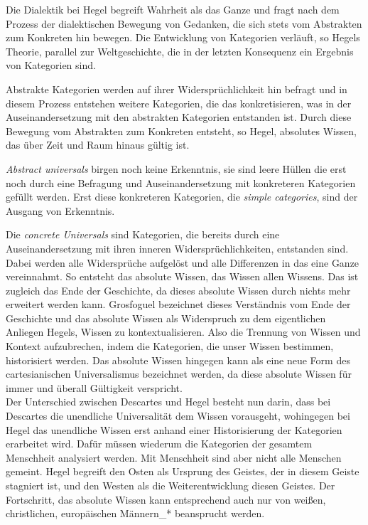 Die Dialektik bei Hegel begreift Wahrheit als das Ganze und fragt nach dem
Prozess der dialektischen Bewegung von Gedanken, die sich stets vom Abstrakten
zum Konkreten hin bewegen. Die Entwicklung von Kategorien verläuft, so Hegels
Theorie, parallel zur Weltgeschichte, die in der letzten Konsequenz ein
Ergebnis von Kategorien sind.\footnotemark {}

Abstrakte Kategorien werden auf ihrer Widersprüchlichkeit hin befragt und in
diesem Prozess entstehen weitere Kategorien, die das konkretisieren, was in der
Auseinandersetzung mit den abstrakten Kategorien entstanden ist. Durch diese
Bewegung vom Abstrakten zum Konkreten entsteht, so Hegel, absolutes Wissen, das
über Zeit und Raum hinaus gültig ist.

\textit{Abstract universals} birgen noch keine
Erkenntnis, sie sind leere Hüllen die erst noch durch eine Befragung und
Auseinandersetzung mit konkreteren Kategorien gefüllt werden. Erst diese
konkreteren Kategorien, die \textit{simple categories}, sind der Ausgang von
Erkenntnis. \footnotemark {}

Die \textit{concrete Universals} sind Kategorien, die bereits durch eine
Auseinandersetzung mit ihren inneren Widersprüchlichkeiten, entstanden
sind.\footnotemark {} Dabei werden alle Widersprüche aufgelöst und alle Differenzen in das eine
Ganze vereinnahmt. So entsteht das absolute Wissen, das Wissen allen
Wissens.\footnotemark {} Das ist zugleich das Ende der Geschichte, da dieses absolute Wissen
durch nichts mehr erweitert werden kann. Grosfoguel bezeichnet dieses
Verständnis vom Ende der Geschichte und das absolute Wissen als Widerspruch zu
dem eigentlichen Anliegen Hegels, Wissen zu kontextualisieren. Also die
Trennung von Wissen und Kontext aufzubrechen, indem die Kategorien, die unser
Wissen bestimmen, historisiert werden. Das absolute Wissen hingegen kann als
eine neue Form des cartesianischen Universalismus bezeichnet werden, da diese
absolute Wissen für immer und überall Gültigkeit verspricht.
\\

Der Unterschied zwischen Descartes und Hegel besteht nun darin, dass bei
Descartes die unendliche Universalität dem Wissen vorausgeht, wohingegen bei
Hegel das unendliche Wissen erst anhand einer Historisierung der Kategorien
erarbeitet wird. Dafür müssen wiederum die Kategorien der gesamtem Menschheit
analysiert werden.  Mit Menschheit sind aber nicht alle Menschen gemeint. Hegel
begreift den Osten als Ursprung des Geistes, der in diesem Geiste stagniert
ist, und den Westen als die Weiterentwicklung diesen Geistes. Der Fortschritt,
das absolute Wissen kann entsprechend auch nur von weißen, christlichen,
europäischen Männern\_* beansprucht werden.

